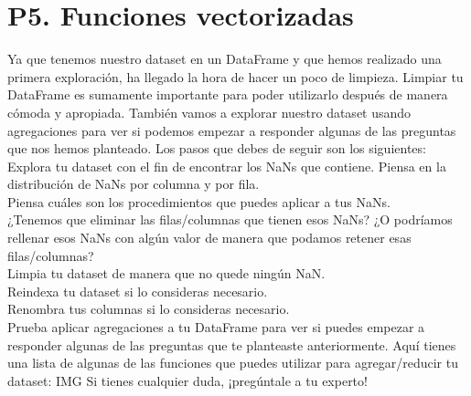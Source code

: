 \documentclass{article}
\begin{document}
\section{P5. Funciones vectorizadas}
Ya que tenemos nuestro dataset en un DataFrame y que hemos realizado una primera exploración, ha llegado la hora de hacer un poco de limpieza. Limpiar tu DataFrame es sumamente importante para poder utilizarlo después de manera cómoda y apropiada. También vamos a explorar nuestro dataset usando agregaciones para ver si podemos empezar a responder algunas de las preguntas que nos hemos planteado. Los pasos que debes de seguir son los siguientes:\\
Explora tu dataset con el fin de encontrar los NaNs que contiene. Piensa en la distribución de NaNs por columna y por fila.\\
Piensa cuáles son los procedimientos que puedes aplicar a tus NaNs.\\ ¿Tenemos que eliminar las filas/columnas que tienen esos NaNs? ¿O podríamos rellenar esos NaNs con algún valor de manera que podamos retener esas filas/columnas?\\
Limpia tu dataset de manera que no quede ningún NaN.\\
Reindexa tu dataset si lo consideras necesario.\\
Renombra tus columnas si lo consideras necesario.\\
Prueba aplicar agregaciones a tu DataFrame para ver si puedes empezar a responder algunas de las preguntas que te planteaste anteriormente. Aquí tienes una lista de algunas de las funciones que puedes utilizar para agregar/reducir tu dataset: IMG Si tienes cualquier duda, ¡pregúntale a tu experto!
\end{document}
